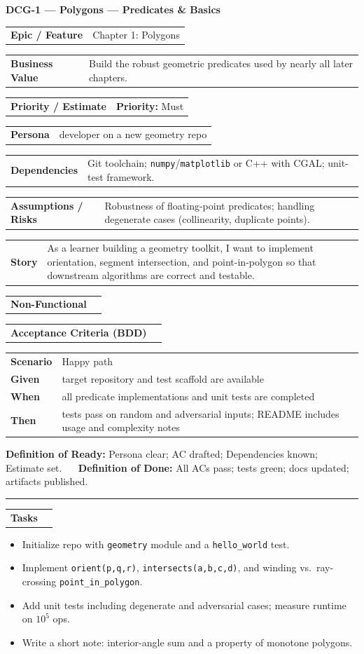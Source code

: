 \documentclass[11pt,a4paper]{article}
\makeatletter
\newcommand{\FieldRow}[2]{%
  \noindent\begin{tabularx}{\linewidth}{@{}>{\bfseries}l X@{}}#1 & #2\\\end{tabularx}%
}
\newcommand{\CardDivider}{\par\noindent\color{CardBorder}\rule{\linewidth}{0.4pt}\par\noindent\color{black}}
\newcommand{\StoryHeader}[2]{%
  {\large\bfseries \textcolor{CardTitle}{#1} --- #2}
}
\newcommand{\BDD}[4]{%
  \FieldRow{Acceptance Criteria (BDD)}{}
  \vspace{-0.75\baselineskip}
  \begin{tabularx}{\linewidth}{@{}>{\bfseries}l X@{}}
  Scenario & #1\\
  Given & #2\\
  When & #3\\
  Then & #4\\
  \end{tabularx}
}
\newenvironment{TaskList}{%
  \begin{itemize}[leftmargin=1.25em,label=\(\square\)]
}{\end{itemize}}
\newcommand{\DefinitionLine}[2]{%
  {\footnotesize\color{Muted}\textbf{#1:} #2}%
}
\makeatother
\begin{document}
\begin{StoryCardBox}
\StoryHeader{DCG-1}{Polygons — Predicates \& Basics}\\[0.4em]
\FieldRow{Epic / Feature}{Chapter 1: Polygons}
\FieldRow{Business Value}{Build the robust geometric predicates used by nearly all later chapters.}
\FieldRow{Priority / Estimate}{\textbf{Priority:} Must \quad \nfchip{SP: 3}}
\FieldRow{Persona}{developer on a new geometry repo}
\FieldRow{Dependencies}{Git toolchain; \texttt{numpy}/\texttt{matplotlib} or C++ with CGAL; unit-test framework.}
\FieldRow{Assumptions / Risks}{Robustness of floating-point predicates; handling degenerate cases (collinearity, duplicate points).}
\FieldRow{Story}{As a learner building a geometry toolkit, I want to implement orientation, segment intersection, and point-in-polygon so that downstream algorithms are correct and testable.}

\FieldRow{Non-Functional}{\nfchip{Rigor} \nfchip{Reproducibility} \nfchip{Clarity} \nfchip{Performance}}

\BDD{Happy path}{target repository and test scaffold are available}{all predicate implementations and unit tests are completed}{tests pass on random and adversarial inputs; README includes usage and complexity notes}

\DefinitionLine{Definition of Ready}{Persona clear; AC drafted; Dependencies known; Estimate set.} \,\, \textbullet \,\,
\DefinitionLine{Definition of Done}{All ACs pass; tests green; docs updated; artifacts published.}

\CardDivider
\FieldRow{\large Tasks}{}
\begin{TaskList}
  \item Initialize repo with \texttt{geometry} module and a \texttt{hello\_world} test.
  \item Implement \texttt{orient(p,q,r)}, \texttt{intersects(a,b,c,d)}, and winding vs.\ ray-crossing \texttt{point\_in\_polygon}.
  \item Add unit tests including degenerate and adversarial cases; measure runtime on \(10^5\) ops.
  \item Write a short note: interior-angle sum and a property of monotone polygons.
\end{TaskList}
\end{StoryCardBox}
\end{document}
